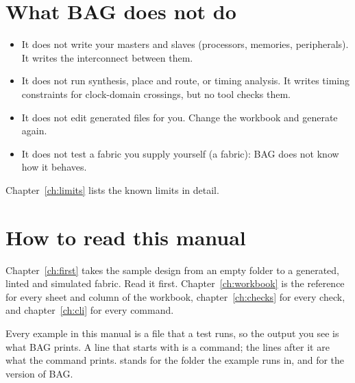 \section{What BAG does not do}

\begin{itemize}
\item It does not write your masters and slaves (processors, memories, peripherals).
  It writes the interconnect between them.
\item It does not run synthesis, place and route, or timing analysis. It writes timing
  constraints for clock-domain crossings, but no tool checks them.
\item It does not edit generated files for you. Change the workbook and generate again.
\item It does not test a fabric you supply yourself (a  fabric): BAG
  does not know how it behaves.
\end{itemize}

Chapter~\ref{ch:limits} lists the known limits in detail.

\section{How to read this manual}

Chapter~\ref{ch:first} takes the sample design from an empty folder to a generated,
linted and simulated fabric. Read it first. Chapter~\ref{ch:workbook} is the reference
for every sheet and column of the workbook, chapter~\ref{ch:checks} for every check, and
chapter~\ref{ch:cli} for every command.

Every example in this manual is a file that a test runs, so the output you see is what
BAG prints. A line that starts with \code{$} is a command; the lines after it are what
the command prints.  stands for the folder the example runs in, and
 for the version of BAG.

